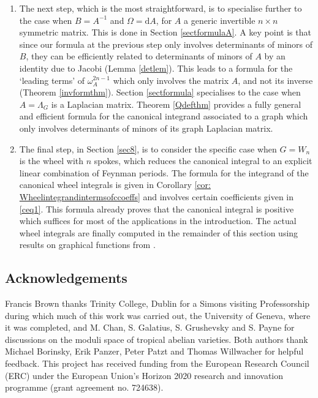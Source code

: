 \documentclass[10pt]{amsart}
\newcommand{\dd}{\mathrm{d}}
\theoremstyle{plain}
\newcommand{\0}{\color{blue}{\mathsf{0}}}
\begin{document}
\begin{enumerate}
\item  The next step, which is the most straightforward, is to specialise further to the case when $B= A^{-1}$ and $\Omega =\dd A$, for $A$ a generic invertible $n\times n$  symmetric matrix. This is done in Section  \ref{sectformulaA}. A key point is that since our formula at the previous step only involves determinants of minors of $B$, they can be efficiently related to determinants of minors of $A$ by an identity due to Jacobi (Lemma \ref{detlem}). This leads to a formula for the `leading terms' of $\omega^{2n-1}_{A}$ which only involves the matrix $A$, and not its inverse (Theorem \ref{invformthm}). Section \ref{sectformula}
specialises to the   case when $A= \Lambda_G$ is a Laplacian matrix. Theorem \ref{Qdefthm} provides  a fully general and efficient formula for the canonical integrand associated to a graph which only involves determinants of minors of its graph Laplacian matrix. 
\item The final step, in Section \ref{sec8}, is to consider the specific case when $G=W_{n}$ is the  wheel with $n$ spokes, which reduces the canonical integral to an explicit linear combination of Feynman periods.  The formula for the integrand of the canonical wheel integrals is given in Corollary \ref{cor: Wheelintegrandintermsofccoeffs} and involves certain coefficients given in \eqref{ceq1}. This formula already proves that the canonical integral is positive which suffices for most of the applications in the introduction. 
The actual  wheel integrals are finally  computed  in the remainder of this section using results on graphical functions from \cite{BorinskySchnetz}. 
\end{enumerate}



\subsection{Acknowledgements}

Francis Brown thanks Trinity College, Dublin for a Simons visiting Professorship during which much of this work was carried out,  the University of Geneva, where it was completed, and M. Chan, S. Galatius, S. Grushevsky and S. Payne for  discussions on the moduli space of tropical abelian varieties. Both authors thank  Michael Borinsky, Erik Panzer,  Peter Patzt and Thomas Willwacher for  helpful  feedback.
This project has received funding from the European Research Council (ERC) under the European Union's 
Horizon 2020 research and innovation programme (grant agreement no. 724638). 
\end{document}
